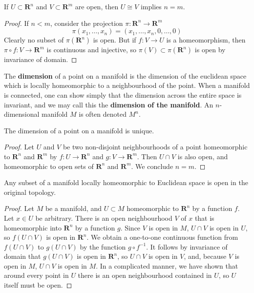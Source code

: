 \begin{lemma}
    If $U \subset \mathbf{R}^n$ and $V \subset \mathbf{R}^m$ are open, then $U \cong V$ implies $n = m$.
\end{lemma}
\begin{proof}
    If $n < m$, consider the projection $\pi: \mathbf{R}^n \to \mathbf{R}^m$
    \[ \pi(x_1, \dots, x_n) = (x_1, \dots, x_n, 0, \dots, 0) \]
    Clearly no subset of $\pi(\mathbf{R}^n)$ is open. But if $f: V \to U$ is a homeomorphism, then $\pi \circ f: V \to \mathbf{R}^m$ is continuous and injective, so $\pi(V) \subset \pi(\mathbf{R}^n)$ is open by invariance of domain.
\end{proof}

The {\bf dimension} of a point on a manifold is the dimension of the euclidean space which is locally homeomorphic to a neighbourhood of the point. When a manifold is connected, one can show simply that the dimension across the entire space is invariant, and we may call this the {\bf dimension of the manifold}. An $n$-dimensional manifold $M$ is often denoted $M^n$.

\begin{corollary}
    The dimension of a point on a manifold is unique.
\end{corollary}
\begin{proof}
    Let $U$ and $V$ be two non-disjoint neighbourhoods of a point homeomorphic to $\mathbf{R}^n$ and $\mathbf{R}^m$ by $f:U \to \mathbf{R}^n$ and $g:V \to \mathbf{R}^m$. Then $U \cap V$ is also open, and homeomorphic to open sets of $\mathbf{R}^n$ and $\mathbf{R}^m$. We conclude $n = m$.
\end{proof}

\begin{theorem}
    Any subset of a manifold locally homeomorphic to Euclidean space is open in the original topology.
\end{theorem}
\begin{proof}
    Let $M$ be a manifold, and $U \subset M$ homeomorphic to $\mathbf{R}^n$ by a function $f$. Let $x \in U$ be arbitrary. There is an open neighbourhood $V$ of $x$ that is homeomorphic into $\mathbf{R}^n$ by a function $g$. Since $V$ is open in $M$, $U \cap V$ is open in $U$, so $f(U \cap V)$ is open in $\mathbf{R}^n$. We obtain a one-to-one continuous function from $f(U \cap V)$ to $g(U \cap V)$ by the function $g \circ f^{-1}$. It follows by invariance of domain that $g(U \cap V)$ is open in $\mathbf{R}^n$, so $U \cap V$ is open in $V$, and, because $V$ is open in $M$, $U \cap V$ is open in $M$. In a complicated manner, we have shown that around every point in $U$ there is an open neighbourhood contained in $U$, so $U$ itself must be open.
\end{proof}

